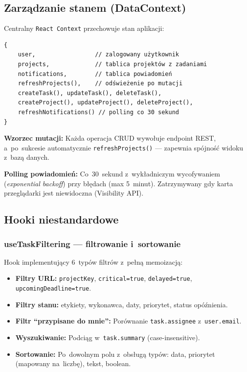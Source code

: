 \subsection{Zarządzanie stanem (DataContext)}

Centralny \texttt{React Context} przechowuje stan aplikacji:

\begin{verbatim}
{
    user,                 // zalogowany użytkownik
    projects,             // tablica projektów z zadaniami
    notifications,        // tablica powiadomień
    refreshProjects(),    // odświeżenie po mutacji
    createTask(), updateTask(), deleteTask(),
    createProject(), updateProject(), deleteProject(),
    refreshNotifications() // polling co 30 sekund
}
\end{verbatim}

\textbf{Wzorzec mutacji:} Każda operacja CRUD wywołuje endpoint REST, a~po~sukcesie automatycznie \texttt{refreshProjects()} --- zapewnia spójność widoku z~bazą danych.

\textbf{Polling powiadomień:} Co~30~sekund z~wykładniczym wycofywaniem (\textit{exponential backoff}) przy błędach (max 5~minut). Zatrzymywany gdy karta przeglądarki jest niewidoczna (Visibility API).

\subsection{Hooki niestandardowe}

\subsubsection{useTaskFiltering --- filtrowanie i~sortowanie}

Hook implementujący 6~typów filtrów z~pełną memoizacją:

\begin{itemize}
    \item \textbf{Filtry URL:} \texttt{projectKey}, \texttt{critical=true}, \texttt{delayed=true}, \texttt{upcomingDeadline=true}.
    \item \textbf{Filtry stanu:} etykiety, wykonawca, daty, priorytet, status opóźnienia.
    \item \textbf{Filtr ``przypisane do mnie'':} Porównanie \texttt{task.assignee} z~\texttt{user.email}.
    \item \textbf{Wyszukiwanie:} Podciąg w~\texttt{task.summary} (case-insensitive).
    \item \textbf{Sortowanie:} Po~dowolnym polu z~obsługą typów: data, priorytet (mapowany na~liczbę), tekst, boolean.
\end{itemize}

